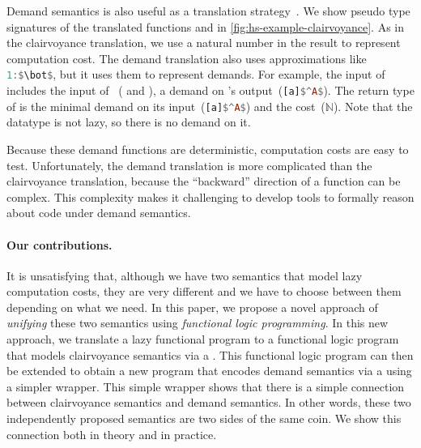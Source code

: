 Demand semantics is also useful as a translation strategy~\cite{demand-semantics}. We show pseudo
type signatures of the translated functions  and  in
\cref{fig:hs-example-clairvoyance}. As in the clairvoyance translation, we use a natural number in
the result to represent computation cost. The demand translation also uses approximations like
\lstinline[language=Haskell,breakatwhitespace,mathescape]{1:$\bot$}, but it uses them to represent
demands.
For example, the input of  includes the input of ~( and
\cdh{[a]}), a demand on 's
output~(\lstinline[language=Haskell,breakatwhitespace,mathescape]{[a]$^A$}). The return type of   is the minimal demand on its
input~(\lstinline[language=Haskell,breakatwhitespace,mathescape]{[a]$^A$}) and
the cost~(\(\mathbb{N}\)). Note that the  datatype is not lazy, so there is
no demand on it.

Because these demand functions are deterministic, computation costs are easy to
test. Unfortunately, the demand translation is more complicated than the
clairvoyance translation, because the ``backward'' direction of a function can
be complex. This complexity makes it challenging to develop tools to formally
reason about code under demand semantics.

\paragraph{Our contributions.}
It is unsatisfying that, although we have two semantics that model lazy
computation costs, they are very different and we have to choose between them
depending on what we need. In this paper, we propose a novel approach of
\emph{unifying} these two semantics using \emph{functional logic programming}.
In this new approach, we translate a lazy functional program to a functional
logic program that models clairvoyance semantics via a \emph{\transCname}. This
functional logic program can then be extended to obtain a new program that
encodes demand semantics via a \emph{\transDname} using a simpler wrapper. This
simple wrapper shows that there is a simple connection between clairvoyance
semantics and demand semantics. In other words, these two independently proposed
semantics are two sides of the same coin. We show this connection both in theory
and in practice.


